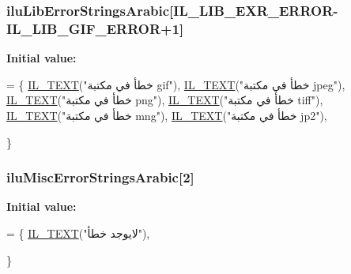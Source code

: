 \hypertarget{ilu__err-arabic_8h_af0661ef819c6f24856db2f0e04da356f}{
\subsubsection[{ilu\-Lib\-Error\-Strings\-Arabic}]{ ilu\-Lib\-Error\-Strings\-Arabic\mbox{[}{\bf I\-L\-\_\-\-L\-I\-B\-\_\-\-E\-X\-R\-\_\-\-E\-R\-R\-O\-R}-\/{\bf I\-L\-\_\-\-L\-I\-B\-\_\-\-G\-I\-F\-\_\-\-E\-R\-R\-O\-R}+1\mbox{]}}}\label{ilu__err-arabic_8h_af0661ef819c6f24856db2f0e04da356f}
{\bfseries Initial value\-:}
\begin{DoxyCode}
= \{
    \hyperlink{il_8h_a2907c2129d2ba2ebbae6aa6a69b7f685}{IL\_TEXT}(\textcolor{stringliteral}{"خطأ في مكتبة gif"}),
    \hyperlink{il_8h_a2907c2129d2ba2ebbae6aa6a69b7f685}{IL\_TEXT}(\textcolor{stringliteral}{"خطأ في مكتبة jpeg"}),
    \hyperlink{il_8h_a2907c2129d2ba2ebbae6aa6a69b7f685}{IL\_TEXT}(\textcolor{stringliteral}{"خطأ في مكتبة png"}),
    \hyperlink{il_8h_a2907c2129d2ba2ebbae6aa6a69b7f685}{IL\_TEXT}(\textcolor{stringliteral}{"خطأ في مكتبة tiff"}),
    \hyperlink{il_8h_a2907c2129d2ba2ebbae6aa6a69b7f685}{IL\_TEXT}(\textcolor{stringliteral}{"خطأ في مكتبة mng"}),
    \hyperlink{il_8h_a2907c2129d2ba2ebbae6aa6a69b7f685}{IL\_TEXT}(\textcolor{stringliteral}{"خطأ في مكتبة jp2"}),

\}
\end{DoxyCode}
\hypertarget{ilu__err-arabic_8h_a77b58f1305188834c5fa93aee6cd92d3}{
\subsubsection[{ilu\-Misc\-Error\-Strings\-Arabic}]{ ilu\-Misc\-Error\-Strings\-Arabic\mbox{[}2\mbox{]}}}\label{ilu__err-arabic_8h_a77b58f1305188834c5fa93aee6cd92d3}
{\bfseries Initial value\-:}
\begin{DoxyCode}
= \{
    \hyperlink{il_8h_a2907c2129d2ba2ebbae6aa6a69b7f685}{IL\_TEXT}(\textcolor{stringliteral}{"لايوجد خطأ"}),

\}
\end{DoxyCode}
